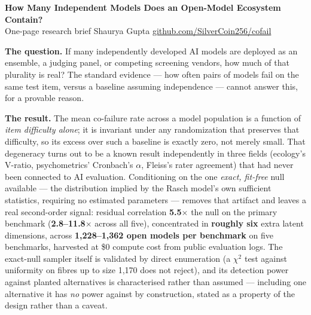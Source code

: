 \documentclass[10pt]{article}
\begin{document}
\begin{center}
{\Large\bfseries How Many Independent Models Does an Open-Model Ecosystem Contain?}\\[3pt]
{\small\color{muted} One-page research brief \quad\textbullet\quad Shaurya Gupta \quad\textbullet\quad
\href{https://github.com/SilverCoin256/cofail}{github.com/SilverCoin256/cofail}}
\end{center}
\vspace{4pt}

\noindent\textbf{The question.} If many independently developed AI models are deployed as an
ensemble, a judging panel, or competing screening vendors, how much of that plurality is real?
The standard evidence — how often pairs of models fail on the same test item, versus a baseline
assuming independence — cannot answer this, for a provable reason.

\vspace{4pt}
\noindent\textbf{The result.} The mean co-failure rate across a model population is a function of
\emph{item difficulty alone}; it is invariant under any randomization that preserves that
difficulty, so its excess over such a baseline is exactly zero, not merely small. That degeneracy
turns out to be a known result independently in three fields (ecology's V-ratio, psychometrics'
Cronbach's $\alpha$, Fleiss's rater agreement) that had never been connected to AI evaluation.
Conditioning on the one \emph{exact, fit-free} null available — the distribution implied by the
Rasch model's own sufficient statistics, requiring no estimated parameters — removes that
artifact and leaves a real second-order signal: residual correlation \textbf{5.5$\times$} the
null on the primary benchmark (\textbf{2.8--11.8$\times$} across all five), concentrated in
\textbf{roughly six} extra latent dimensions, across \textbf{1{,}228--1{,}362 open models
per benchmark} on five benchmarks, harvested at \$0 compute cost from public evaluation logs.
The exact-null sampler itself is validated by direct enumeration (a $\chi^2$ test against
uniformity on fibres up to size 1{,}170 does not reject), and its detection power against
planted alternatives is characterised rather than assumed — including one alternative it has
\emph{no} power against by construction, stated as a property of the design rather than a
caveat.
\end{document}
